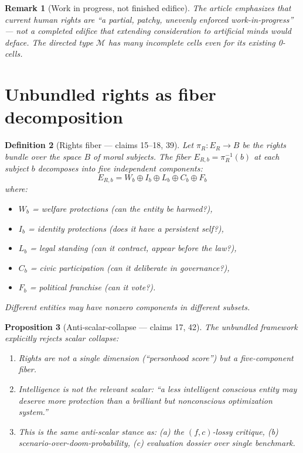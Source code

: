\documentclass[11pt,a4paper]{article}
\newtheorem{definition}{Definition}[section]
\newtheorem{proposition}[definition]{Proposition}
\newtheorem{remark}[definition]{Remark}
\begin{document}
\begin{remark}[Work in progress, not finished edifice]
The article emphasizes that current human rights are ``a partial, patchy,
unevenly enforced work-in-progress'' --- not a completed edifice that
extending consideration to artificial minds would deface. The directed
type $\mathcal{M}$ has many incomplete cells even for its existing 0-cells.
\end{remark}

\section{Unbundled rights as fiber decomposition}
\label{sec:unbundled}

\begin{definition}[Rights fiber --- claims 15--18, 39]
\label{def:rights-fiber}
Let $\pi_R : E_R \to B$ be the \emph{rights bundle} over the space $B$ of
moral subjects. The fiber $E_{R,b} = \pi_R^{-1}(b)$ at each subject $b$
decomposes into five independent components:
\[
  E_{R,b} = W_b \oplus I_b \oplus L_b \oplus C_b \oplus F_b
\]
where:
\begin{itemize}
\item $W_b$ = welfare protections (can the entity be harmed?),
\item $I_b$ = identity protections (does it have a persistent self?),
\item $L_b$ = legal standing (can it contract, appear before the law?),
\item $C_b$ = civic participation (can it deliberate in governance?),
\item $F_b$ = political franchise (can it vote?).
\end{itemize}
Different entities may have nonzero components in different subsets.
\end{definition}

\begin{proposition}[Anti-scalar-collapse --- claims 17, 42]
\label{prop:anti-scalar}
The unbundled framework explicitly rejects scalar collapse:
\begin{enumerate}
\item Rights are not a single dimension (``personhood score'') but a
  five-component fiber.
\item Intelligence is not the relevant scalar: ``a less intelligent
  conscious entity may deserve more protection than a brilliant but
  nonconscious optimization system.''
\item This is the same anti-scalar stance as: (a) the $(f,c)$-lossy
  critique, (b) scenario-over-doom-probability, (c) evaluation dossier
  over single benchmark.
\end{enumerate}
\end{proposition}
\end{document}
